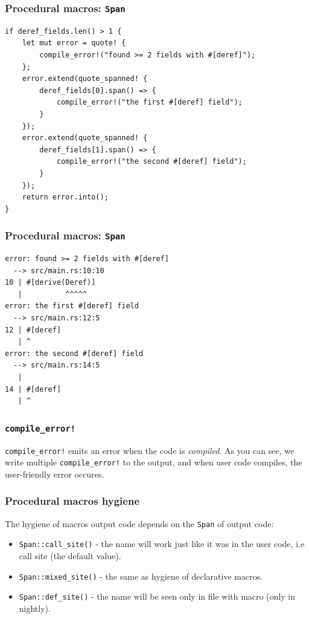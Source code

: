 \documentclass[aspectratio=1610,t]{beamer}
\begin{document}
\begin{frame}[fragile]
\frametitle{Procedural macros: \texttt{Span}}
\begin{verbatim}
if deref_fields.len() > 1 {
    let mut error = quote! {
        compile_error!("found >= 2 fields with #[deref]");
    };
    error.extend(quote_spanned! {
        deref_fields[0].span() => {
            compile_error!("the first #[deref] field");
        }
    });
    error.extend(quote_spanned! {
        deref_fields[1].span() => {
            compile_error!("the second #[deref] field");
        }
    });
    return error.into();
}
\end{verbatim}
\end{frame}


\begin{frame}[fragile]
\frametitle{Procedural macros: \texttt{Span}}
\begin{verbatim}
error: found >= 2 fields with #[deref]
  --> src/main.rs:10:10
10 | #[derive(Deref)]
   |          ^^^^^
error: the first #[deref] field
  --> src/main.rs:12:5
12 | #[deref]
   | ^
error: the second #[deref] field
  --> src/main.rs:14:5
   |
14 | #[deref]
   | ^
\end{verbatim}
\end{frame}


\begin{frame}[fragile]
\frametitle{\texttt{compile\_error!}}
\texttt{compile\_error!} emits an error when the code is \textit{compiled}. As you can see, we write multiple \texttt{compile\_error!} to the output, and when user code compiles, the user-friendly error occures.
\end{frame}


\begin{frame}[fragile]
\frametitle{Procedural macros hygiene}
The hygiene of macros output code depends on the \texttt{Span} of output code:

\begin{itemize}
    \item \texttt{Span::call\_site()} - the name will work just like it was in the user code, i.e call site (the default value).
    \item \texttt{Span::mixed\_site()} - the same as hygiene of declarative macros.
    \item \texttt{Span::def\_site()} - the name will be seen only in file with macro (only in nightly).
\end{itemize}
\end{frame}
\end{document}
